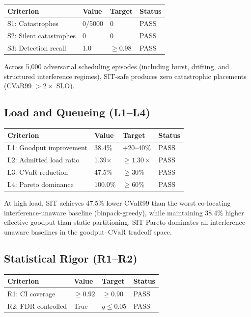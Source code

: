 \documentclass[11pt,twocolumn]{article}
\begin{document}
\begin{tabular}{llll}
\toprule
Criterion & Value & Target & Status \\
\midrule
S1: Catastrophes & 0/5000 & 0 & PASS \\
S2: Silent catastrophes & 0 & 0 & PASS \\
S3: Detection recall & 1.0 & $\geq 0.98$ & PASS \\
\bottomrule
\end{tabular}

\noindent Across 5,000 adversarial scheduling episodes (including
burst, drifting, and structured interference regimes), SIT-safe
produces zero catastrophic placements (CVaR99 $> 2\times$ SLO).

\subsection{Load and Queueing (L1--L4)}

\begin{tabular}{llll}
\toprule
Criterion & Value & Target & Status \\
\midrule
L1: Goodput improvement & 38.4\% & $+20$--$40$\% & PASS \\
L2: Admitted load ratio & 1.39$\times$ & $\geq 1.30\times$ & PASS \\
L3: CVaR reduction & 47.5\% & $\geq 30$\% & PASS \\
L4: Pareto dominance & 100.0\% & $\geq 60$\% & PASS \\
\bottomrule
\end{tabular}

\noindent At high load, SIT achieves 47.5\% lower CVaR99
than the worst co-locating interference-unaware baseline (binpack-greedy),
while maintaining 38.4\% higher effective goodput than
static partitioning. SIT Pareto-dominates all interference-unaware
baselines in the goodput--CVaR tradeoff space.

\subsection{Statistical Rigor (R1--R2)}

\begin{tabular}{llll}
\toprule
Criterion & Value & Target & Status \\
\midrule
R1: CI coverage & $\geq 0.92$ & $\geq 0.90$ & PASS \\
R2: FDR controlled & True & $q \leq 0.05$ & PASS \\
\bottomrule
\end{tabular}
\end{document}
